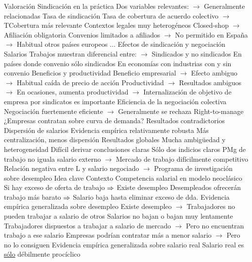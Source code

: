 \documentclass{nuevotema}
\begin{document}
\begin{esquemal}
		\2 Valoración
			\3 Sindicación en la práctica
				\4 Dos variables relevantes:
				\4[] $\to$ Generalmente relacionadas
				\4[] Tasa de sindicación
				\4[] Tasa de cobertura de acuerdo colectivo
				\4[] $\to$ TCobertura más relevante
				\4 Contextos legales muy heterogéneos
				\4[] Closed-shop
				\4[] $\to$ Afiliación obligatoria
				\4[] Convenios limitados a afiliados
				\4[] $\to$ No permitido en España
				\4[] $\to$ Habitual otros países europeos
				\4[] ...
			\3 Efectos de sindicación y negociación
				\4 Salarios
				\4[] Trabajos muestran diferencial entre:
				\4[] $\to$ Sindicados y no sindicados
				\4[] En países donde convenio sólo sindicados
				\4[] En economías con industrias con y sin convenio
				\4 Beneficios y productividad
				\4[] Beneficio empresarial
				\4[] $\to$ Efecto ambiguo
				\4[] $\to$ Habitual caída de precio de acción
				\4[] Productividad
				\4[] $\to$ Resultados ambiguos
				\4[] $\to$ En ocasiones, aumenta productividad
				\4[] $\to$ Internalización de objetivo de empresa por sindicatos es importante
			\3 Eficiencia de la negociación colectiva
				\4 Negociación fuertemente eficiente
				\4[] $\to$ Generalmente se rechaza
				\4 Right-to-manage
				\4[] ¿Empresas contratan sobre curva de demanda?
				\4[] Resultados contradictorios
			\3 Dispersión de salarios
				\4 Evidencia empírica relativamente robusta
				\4 Más centralización, menos dispersión
			\3 Resultados globales
				\4 Mucha ambigüedad y heterogeneidad
				\4 Difícil derivar conclusiones claras
				\4 Sólo dos indicios claros
				\4[] PMg de trabajo no iguala salario externo
				\4[] $\to$ Mercado de trabajo difícilmente competitivo
				\4[] Relación negativa entre L y salario negociado
				\4[] $\to$ Programa de investigación sobre desempleo
	\1 
		\2 Idea clave
			\3 Contexto
				\4 Competencia salarial en modelo neoclásico
				\4[] Si hay exceso de oferta de trabajo
				\4[] $\Rightarrow$ Existe desempleo
				\4[] Desempleados ofrecerán trabajo más barato
				\4[] $\Rightarrow$ Salario baja hasta eliminar exceso de dda.
				\4 Evidencia empírica generalizada sobre desempleo
				\4[] Existe desempleo
				\4[] $\to$ Trabajadores no pueden trabajar a salario de otros
				\4[] Salarios no bajan o bajan muy lentamente
				\4[] Trabajadores dispuestos a trabajar a salario de mercado
				\4[] $\to$ Pero no encuentran trabajo a ese salario
				\4[] Empresas podrían contratar más a menor salario
				\4[] $\to$ Pero no lo consiguen
				\4 Evidencia empírica generalizada sobre salario real
				\4[] Salario real es \underline{sólo} débilmente procíclico

\end{esquemal}
\end{document}
